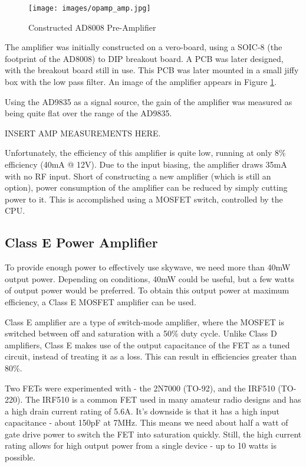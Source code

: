 \documentclass[a4paper,12pt]{article}
\begin{document}
\begin{figure}[h]
  \begin{center}
    \texttt{[image: images/opamp\_amp.jpg]}
  \end{center}
  \caption{Constructed AD8008 Pre-Amplifier}
  \label{fig:ad8008}
\end{figure}

The amplifier was initially constructed on a vero-board, using a SOIC-8 (the footprint of the AD8008) to DIP breakout board. A PCB was later designed, with the breakout board still in use. This PCB was later mounted in a small jiffy box with the low pass filter. An image of the amplifier appears in Figure \ref{fig:ad8008}.

Using the AD9835 as a signal source, the gain of the amplifier was measured as being quite flat over the range of the AD9835.

INSERT AMP MEASUREMENTS HERE.

Unfortunately, the efficiency of this amplifier is quite low, running at only 8\% efficiency (40mA @ 12V). Due to the input biasing, the amplifier draws 35mA with no RF input. Short of constructing a new amplifier (which is still an option), power consumption of the amplifier can be reduced by simply cutting power to it. This is accomplished using a MOSFET switch, controlled by the CPU. 

\subsection{Class E Power Amplifier}
To provide enough power to effectively use skywave, we need more than 40mW output power. Depending on conditions, 40mW could be useful, but a few watts of output power would be preferred. To obtain this output power at maximum efficiency, a Class E MOSFET amplifier can be used.

Class E amplifier are a type of switch-mode amplifier, where the MOSFET is switched between off and saturation with a 50\% duty cycle. Unlike Class D amplifiers, Class E makes use of the output capacitance of the FET as a tuned circuit, instead of treating it as a loss. This can result in efficiencies greater than 80\%.

Two FETs were experimented with - the 2N7000 (TO-92), and the IRF510 (TO-220). The IRF510 is a common FET used in many amateur radio designs and has a high drain current rating of 5.6A. It's downside is that it has a high input capacitance - about 150pF at 7MHz. This means we need about half a watt of gate drive power to switch the FET into saturation quickly. Still, the high current rating allows for high output power from a single device - up to 10 watts is possible.
\end{document}
